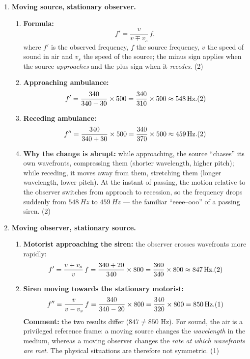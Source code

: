 \documentclass[11pt]{article}
\begin{document}
\begin{corrige}
\begin{enumerate}
\item \textbf{Moving source, stationary observer.}
\begin{enumerate}
\item \textbf{Formula:}
\[ f' = \frac{v}{v \mp v_s}\,f, \]
where $f'$ is the observed frequency, $f$ the source frequency, $v$ the speed of sound in air and $v_s$ the speed of the source; the minus sign applies when the source \emph{approaches} and the plus sign when it \emph{recedes}. \hfill (2)
\item \textbf{Approaching ambulance:}
\[ f' = \frac{340}{340 - 30}\times 500 = \frac{340}{310}\times 500 \approx \SI{548}{Hz}. \hfill (2) \]
\item \textbf{Receding ambulance:}
\[ f'' = \frac{340}{340 + 30}\times 500 = \frac{340}{370}\times 500 \approx \SI{459}{Hz}. \hfill (2) \]
\item \textbf{Why the change is abrupt:} while approaching, the source ``chases'' its own wavefronts, compressing them (shorter wavelength, higher pitch); while receding, it moves away from them, stretching them (longer wavelength, lower pitch). At the instant of passing, the motion relative to the observer switches from approach to recession, so the frequency drops suddenly from $\SI{548}{Hz}$ to $\SI{459}{Hz}$ --- the familiar ``eeee--ooo'' of a passing siren. \hfill (2)
\end{enumerate}
\item \textbf{Moving observer, stationary source.}
\begin{enumerate}
\item \textbf{Motorist approaching the siren:} the observer crosses wavefronts more rapidly:
\[ f' = \frac{v + v_o}{v}\,f = \frac{340 + 20}{340}\times 800 = \frac{360}{340}\times 800 \approx \SI{847}{Hz}. \hfill (2) \]
\item \textbf{Siren moving towards the stationary motorist:}
\[ f'' = \frac{v}{v - v_s}\,f = \frac{340}{340 - 20}\times 800 = \frac{340}{320}\times 800 = \SI{850}{Hz}. \hfill (1) \]
\textbf{Comment:} the two results differ ($847 \neq 850$ Hz). For sound, the air is a privileged reference frame: a moving source changes the \emph{wavelength} in the medium, whereas a moving observer changes the \emph{rate at which wavefronts are met}. The physical situations are therefore not symmetric. \hfill (1)
\end{enumerate}

\end{enumerate}
\end{corrige}
\end{document}
